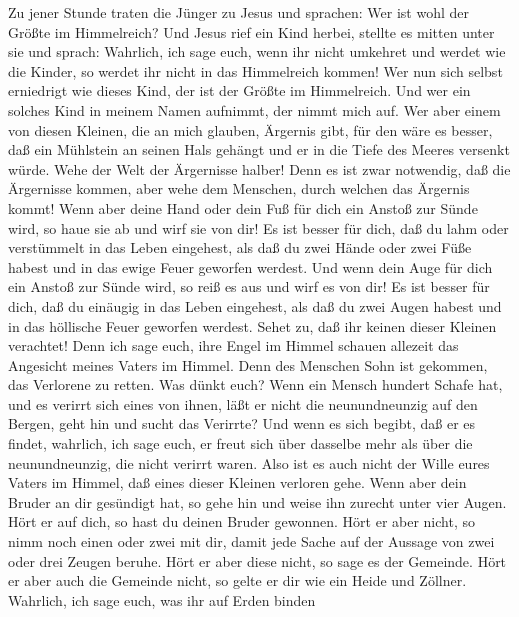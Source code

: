  Zu jener Stunde traten die Jünger zu Jesus und sprachen:
Wer ist wohl der Größte im Himmelreich?  Und Jesus rief
ein Kind herbei, stellte es mitten unter sie  und sprach:
Wahrlich, ich sage euch, wenn ihr nicht umkehret und werdet wie die
Kinder, so werdet ihr nicht in das Himmelreich kommen! 
Wer nun sich selbst erniedrigt wie dieses Kind, der ist der Größte im
Himmelreich.  Und wer ein solches Kind in meinem Namen
aufnimmt, der nimmt mich auf.  Wer aber einem von diesen
Kleinen, die an mich glauben, Ärgernis gibt, für den wäre es besser, daß
ein Mühlstein an seinen Hals gehängt und er in die Tiefe des Meeres
versenkt würde.  Wehe der Welt der Ärgernisse halber! Denn
es ist zwar notwendig, daß die Ärgernisse kommen, aber wehe dem
Menschen, durch welchen das Ärgernis kommt!  Wenn aber
deine Hand oder dein Fuß für dich ein Anstoß zur Sünde wird, so haue sie
ab und wirf sie von dir! Es ist besser für dich, daß du lahm oder
verstümmelt in das Leben eingehest, als daß du zwei Hände oder zwei Füße
habest und in das ewige Feuer geworfen werdest.  Und wenn
dein Auge für dich ein Anstoß zur Sünde wird, so reiß es aus und wirf es
von dir! Es ist besser für dich, daß du einäugig in das Leben eingehest,
als daß du zwei Augen habest und in das höllische Feuer geworfen
werdest.  Sehet zu, daß ihr keinen dieser Kleinen
verachtet! Denn ich sage euch, ihre Engel im Himmel schauen allezeit das
Angesicht meines Vaters im Himmel.  Denn des Menschen
Sohn ist gekommen, das Verlorene zu retten.  Was dünkt
euch? Wenn ein Mensch hundert Schafe hat, und es verirrt sich eines von
ihnen, läßt er nicht die neunundneunzig auf den Bergen, geht hin und
sucht das Verirrte?  Und wenn es sich begibt, daß er es
findet, wahrlich, ich sage euch, er freut sich über dasselbe mehr als
über die neunundneunzig, die nicht verirrt waren.  Also
ist es auch nicht der Wille eures Vaters im Himmel, daß eines dieser
Kleinen verloren gehe.  Wenn aber dein Bruder an dir
gesündigt hat, so gehe hin und weise ihn zurecht unter vier Augen. Hört
er auf dich, so hast du deinen Bruder gewonnen.  Hört er
aber nicht, so nimm noch einen oder zwei mit dir, damit jede Sache auf
der Aussage von zwei oder drei Zeugen beruhe.  Hört er
aber diese nicht, so sage es der Gemeinde. Hört er aber auch die
Gemeinde nicht, so gelte er dir wie ein Heide und Zöllner.
 Wahrlich, ich sage euch, was ihr auf Erden binden
